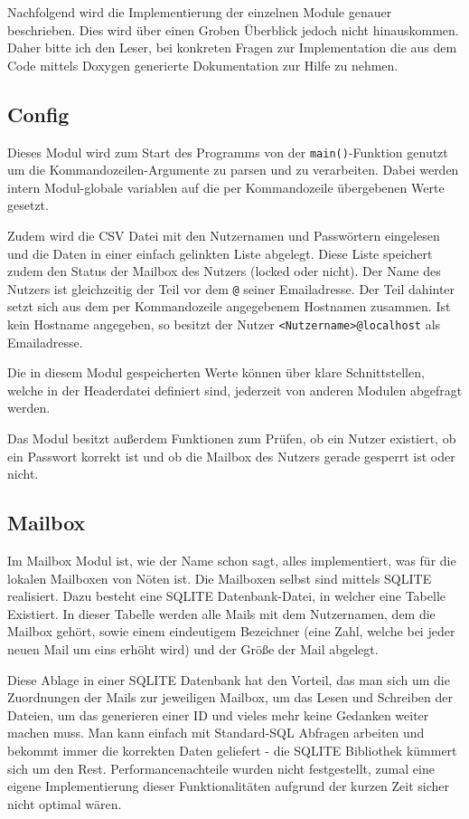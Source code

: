 \documentclass[final,a4paper,11pt,notitlepage,halfparskip]{scrreprt}
\begin{document}
Nachfolgend wird die Implementierung der einzelnen Module genauer beschrieben.
Dies wird über einen Groben Überblick jedoch nicht hinauskommen. Daher bitte ich
den Leser, bei konkreten Fragen zur Implementation die aus dem Code mittels
Doxygen generierte Dokumentation zur Hilfe zu nehmen. 


\subsection{Config}
Dieses Modul wird zum Start des Programms von der \texttt{main()}-Funktion
genutzt um die Kommandozeilen-Argumente zu parsen und zu verarbeiten. Dabei
werden intern Modul-globale variablen auf die per Kommandozeile übergebenen
Werte gesetzt. 

Zudem wird die CSV Datei mit den Nutzernamen und Passwörtern eingelesen und die
Daten in einer einfach gelinkten Liste abgelegt. Diese Liste speichert zudem den
Status der Mailbox des Nutzers (locked oder nicht). Der Name des Nutzers ist
gleichzeitig der Teil vor dem \texttt{@} seiner Emailadresse. Der Teil dahinter
setzt sich aus dem per Kommandozeile angegebenem Hostnamen zusammen. Ist kein
Hostname angegeben, so besitzt der Nutzer \texttt{<Nutzername>@localhost} als
Emailadresse.

Die in diesem Modul gespeicherten Werte können über klare Schnittstellen, welche
in der Headerdatei definiert sind, jederzeit von anderen Modulen abgefragt
werden.

Das Modul besitzt außerdem Funktionen zum Prüfen, ob ein Nutzer existiert, ob
ein Passwort korrekt ist und ob die Mailbox des Nutzers gerade gesperrt ist oder
nicht.


\subsection{Mailbox}
Im Mailbox Modul ist, wie der Name schon sagt, alles implementiert, was für die
lokalen Mailboxen von Nöten ist. Die Mailboxen selbst sind mittels SQLITE
realisiert. Dazu besteht eine SQLITE Datenbank-Datei, in welcher eine Tabelle
Existiert. In dieser Tabelle werden alle Mails mit dem Nutzernamen, dem die
Mailbox gehört, sowie einem eindeutigem Bezeichner (eine Zahl, welche bei jeder
neuen Mail um eins erhöht wird) und der Größe der Mail abgelegt.

Diese Ablage in einer SQLITE Datenbank hat den Vorteil, das man sich um die
Zuordnungen der Mails zur jeweiligen Mailbox, um das Lesen und Schreiben der
Dateien, um das generieren einer ID und vieles mehr keine Gedanken weiter machen
muss. Man kann einfach mit Standard-SQL Abfragen arbeiten und bekommt immer die
korrekten Daten geliefert - die SQLITE Bibliothek kümmert sich um den Rest.
Performancenachteile wurden nicht festgestellt, zumal eine eigene
Implementierung dieser Funktionalitäten aufgrund der kurzen Zeit sicher nicht
optimal wären.
\end{document}
